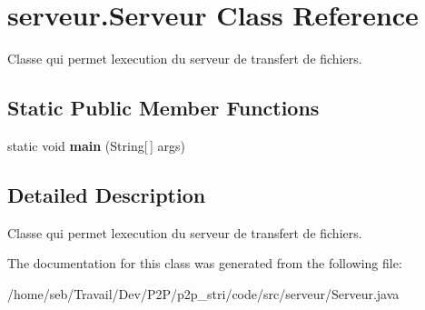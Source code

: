 \hypertarget{classserveur_1_1Serveur}{}\section{serveur.\+Serveur Class Reference}
\label{classserveur_1_1Serveur}


Classe qui permet l\textquotesingle{}execution du serveur de transfert de fichiers.  


\subsection*{Static Public Member Functions}
\begin{DoxyCompactItemize}
\item 
\mbox{\label{classserveur_1_1Serveur_a1cf09998c1efabe4a9db7b454cfcbe69}} 
static void {\bfseries main} (String\mbox{[}$\,$\mbox{]} args)
\end{DoxyCompactItemize}


\subsection{Detailed Description}
Classe qui permet l\textquotesingle{}execution du serveur de transfert de fichiers. 

The documentation for this class was generated from the following file\+:\begin{DoxyCompactItemize}
\item 
/home/seb/\+Travail/\+Dev/\+P2\+P/p2p\+\_\+stri/code/src/serveur/Serveur.\+java\end{DoxyCompactItemize}
